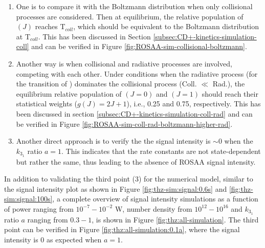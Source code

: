 \begin{enumerate}
    \item  One is to compare it with the Boltzmann distribution when only collisional
          processes are considered. Then at equilibrium, the relative population of
          \CD$(J)$ reaches T$_{coll}$, which should be equivalent to the
          Boltzmann distribution at T$_{coll}$. This has been discussed in Section
          \ref{subsec:CD+-kinetics-simulation-coll} and can be verified in Figure
          \ref{fig:ROSAA-sim-collisional-boltzmann}.
    \item Another way is when collisional and radiative processes are involved,
          competing with each other. Under conditions when the radiative process (for
          the \CDline transition of \CD) dominates the collisional process (Coll. $\ll$
          Rad.), the equilibrium relative population of \CD$(J=0)$ and \CD$(J=1)$ should
          reach their statistical weights ($g(J) = 2J+1$), i.e., 0.25 and 0.75,
          respectively. This has been discussed in section
          \ref{subsec:CD+-kinetics-simulation-coll-rad} and can be verified in Figure
          \ref{fig:ROSAA-sim-coll-rad-boltzmann-higher-rad}.
    \item Another direct approach is to verify the the signal intensity is $\sim 0$ when
          the $k_{3_1}$ ratio $a=1$. This indicates that the rate constants are not
          state-dependent but rather the same, thus leading to the absence of ROSAA
          signal intensity.
\end{enumerate}

In addition to validating the third point (3) for the numerical model, similar
to the signal intensity plot as shown in Figure \ref{fig:thz-sim:signal:0.6s}
and \ref{fig:thz-sim:signal:100s}, a complete overview of signal intensity
simulations as a function of power ranging from $10^{-7}-10^{-2}$ W, number
density from $10^{12}-10^{16}$ \percc and $k_{3_1}$ ratio $a$ ranging from
$0.3-1$, is shown in Figure \ref{fig:thz:all-simulation}. The third point can
be verified in Figure \ref{fig:thz:all-simulation:0.1a}, where the
signal intensity is 0 as expected when $a=1$.\\

